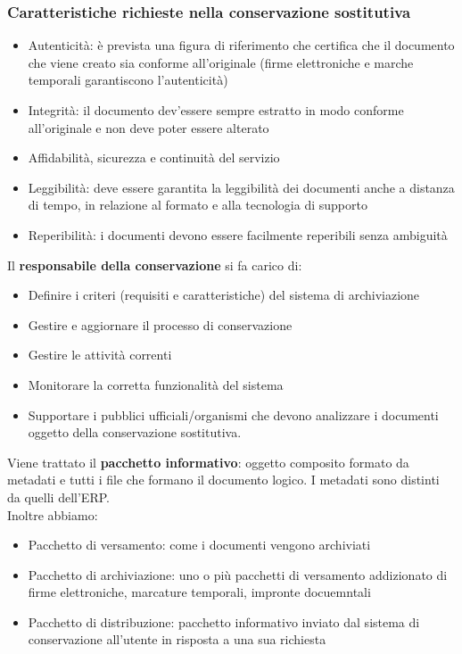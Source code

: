 \subsubsection{Caratteristiche richieste nella conservazione
sostitutiva}

\begin{itemize}
\item
  Autenticit\`a: \`e prevista una figura di riferimento che certifica che il
  documento che viene creato sia conforme all'originale (firme
  elettroniche e marche temporali garantiscono l'autenticit\`a)
\item
  Integrit\`a: il documento dev'essere sempre estratto in modo conforme
  all'originale e non deve poter essere alterato
\item
  Affidabilit\`a, sicurezza e continuit\`a del servizio
\item
  Leggibilit\`a: deve essere garantita la leggibilit\`a dei documenti anche
  a distanza di tempo, in relazione al formato e alla tecnologia di supporto
\item
  Reperibilit\`a: i documenti devono essere facilmente reperibili senza 
  ambiguit\`a
  
\end{itemize}

Il \textbf{responsabile della conservazione} si fa carico di:

\begin{itemize}
  \item 
    Definire i criteri (requisiti e caratteristiche) del sistema di 
    archiviazione
  \item
    Gestire e aggiornare il processo di conservazione
  \item 
    Gestire le attivit\`a correnti
  \item 
     Monitorare la corretta funzionalit\`a del sistema
  \item 
    Supportare i pubblici ufficiali/organismi che devono analizzare i
    documenti oggetto della conservazione sostitutiva.
\end{itemize}

Viene trattato il \textbf{pacchetto informativo}: oggetto composito formato da 
metadati e tutti i file che formano il documento logico. 
I metadati sono distinti da quelli dell'ERP.\\

Inoltre abbiamo:
\begin{itemize}
  \item
    Pacchetto di versamento: come i documenti vengono archiviati
  \item
    Pacchetto di archiviazione: uno o più pacchetti di versamento addizionato
    di firme elettroniche, marcature temporali, impronte docuemntali
  \item
    Pacchetto di distribuzione: pacchetto informativo inviato dal sistema
    di conservazione all'utente in risposta a una sua richiesta
\end{itemize}

